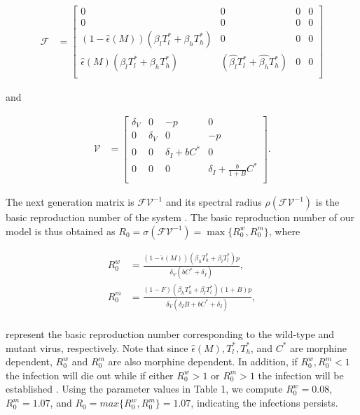 \documentclass[11pt, oneside]{article}    %
\begin{document}
\vspace{5mm}

\begin{align*}
{\mathcal F} & =  \begin{bmatrix}
 0 & 0 & 0 & 0\\
0 & 0 & 0 & 0\\
(1-\hat{\epsilon}(M)) ( \beta_l T_l^* + \beta_h T_h^*) & 0 & 0 & 0\\
\hat{\epsilon}(M) ( \beta_l T_l^* + \beta_h T_h^*) & (\hat{\beta_l} T_l^* + \hat{ \beta_h} T_h^*) & 0 & 0\\
\end{bmatrix}
\end{align*}

and 

\begin{align*}
{\mathcal V} & =  \begin{bmatrix}
\delta_V & 0 & -p & 0\\
0 & \delta_V & 0 & -p\\
0 & 0 & \delta_I + b C^* & 0\\
0 & 0 & 0 & \delta_I + \frac{b}{1+B} C^*\\
\end{bmatrix}.
\end{align*}

\vspace{5mm}

The next generation matrix is ${\mathcal F \mathcal V}^{-1}$ and its spectral radius $\rho(\mathcal F \mathcal V^{-1})$ is the basic reproduction number of the system \cite{Diekmann}. The basic reproduction number of our model is thus obtained as $R_0 = \sigma(\mathcal F \mathcal V^{-1}) = \max\{R_0^w,R_0^m\}$, where 

\begin{align*}
R_0^w & = \frac{(1 - \hat{\epsilon}(M)) (\beta_h T_h^* +  \beta_l T_l^*)p}{\delta_V (bC^* + \delta_I)},\\
R_0^m &= \frac{(1-F)(\beta_h T_h^* +  \beta_l T_l^*)(1+B)p}{\delta_V (\delta_I B + bC^* + \delta_I)},  \\
\end{align*}

represent the basic reproduction number corresponding to the wild-type and mutant virus, respectively. Note that since $\hat{\epsilon}(M), T_l^*, T_h^*$, and $C^*$ are morphine dependent, $R_0^w$ and $R_0^m$ are also morphine dependent. In addition, if $R_0^w, R_0^m <1$ the infection will die out while if either $R_0^w > 1$ or $R_0^m > 1$ the infection will be established \cite{Castillo-Chavez}. Using the parameter values in Table 1, we compute $R_0^w = 0.08$, $R_0^m = 1.07$, and $R_0 = max\{R_0^w,R_0^m\} = 1.07$, indicating the infections persists.
\end{document}

